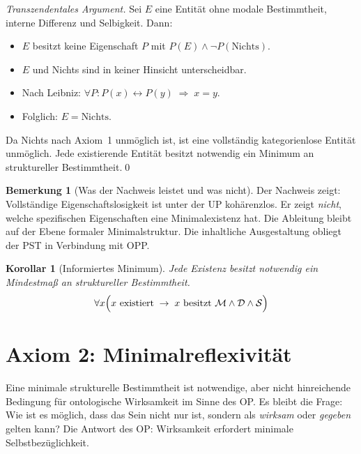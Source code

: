 \documentclass[11pt,a4paper]{article}
\theoremstyle{plain}
\newtheorem{corollary}{Korollar}[section]
\theoremstyle{definition}
\newtheorem{remark}{Bemerkung}[section]
\begin{document}
\begin{proof}[Transzendentales Argument]
Sei $E$ eine Entit\"{a}t ohne modale Bestimmtheit, interne Differenz und Selbigkeit. Dann:
\begin{itemize}
  \item $E$ besitzt keine Eigenschaft $P$ mit $P(E)\wedge\neg P(\text{Nichts})$.
  \item $E$ und \glqq{}Nichts\grqq{} sind in keiner Hinsicht unterscheidbar.
  \item Nach Leibniz: $\forall P\colon P(x)\leftrightarrow P(y)\;\Rightarrow\;x=y$.
  \item Folglich: $E = \text{Nichts}$.
\end{itemize}
Da \glqq{}Nichts\grqq{} nach Axiom~1 unm\"{o}glich ist, ist eine vollst\"{a}ndig
kategorienlose Entit\"{a}t unm\"{o}glich. Jede existierende Entit\"{a}t besitzt notwendig
ein Minimum an struktureller Bestimmtheit.\qed
\end{proof}

\begin{remark}[Was der Nachweis leistet und was nicht]
Der Nachweis zeigt: Vollst\"{a}ndige Eigenschaftslosigkeit ist unter der UP
koh\"{a}renzlos. Er zeigt \emph{nicht}, welche spezifischen Eigenschaften eine
Minimalexistenz hat. Die Ableitung bleibt auf der Ebene formaler Minimalstruktur. Die
inhaltliche Ausgestaltung obliegt der PST in Verbindung mit OPP.
\end{remark}

\begin{corollary}[Informiertes Minimum]
Jede Existenz besitzt notwendig ein Mindestma\ss{} an struktureller Bestimmtheit.
\[
  \forall x
  \Bigl(
    x\text{ existiert}
    \;\rightarrow\;
    x\text{ besitzt }\mathcal{M}\wedge\mathcal{D}\wedge\mathcal{S}
  \Bigr)
\]
\end{corollary}

\section{Axiom 2: Minimalreflexivit\"{a}t}

Eine minimale strukturelle Bestimmtheit ist notwendige, aber nicht hinreichende Bedingung
f\"{u}r ontologische Wirksamkeit im Sinne des OP. Es bleibt die Frage: Wie ist es
m\"{o}glich, dass das Sein nicht nur \glqq{}ist\grqq{}, sondern als \emph{wirksam} oder
\emph{gegeben} gelten kann? Die Antwort des OP: Wirksamkeit erfordert minimale
Selbstbez\"{u}glichkeit.
\end{document}
